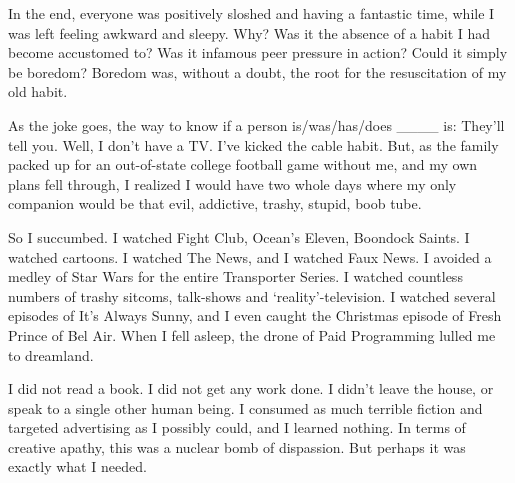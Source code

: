 \documentclass[letterpaper]{article}
\begin{document}
    In the end, everyone was positively sloshed and having a fantastic time, while I was left feeling awkward and sleepy. Why? Was it the absence of a habit I had become accustomed to? Was it infamous peer pressure in action? Could it simply be boredom? Boredom was, without a doubt, the root for the resuscitation of my old habit.

    As the joke goes, the way to know if a person is/was/has/does \_\_\_\_ is: They'll tell you. Well, I don't have a TV. I've kicked the cable habit. But, as the family packed up for an out-of-state college football game without me, and my own plans fell through, I realized I would have two whole days where my only companion would be that evil, addictive, trashy, stupid, boob tube.

    So I succumbed.  I watched Fight Club, Ocean's Eleven, Boondock Saints. I watched cartoons. I watched The News, and I watched Faux News. I avoided a medley of Star Wars for the entire Transporter Series. I watched countless numbers of trashy sitcoms, talk-shows and `reality'-television. I watched several episodes of It's Always Sunny, and I even caught the Christmas episode of Fresh Prince of Bel Air. When I fell asleep, the drone of Paid Programming lulled me to dreamland.

    I did not read a book. I did not get any work done. I didn't leave the house, or speak to a single other human being. I consumed as much terrible fiction and targeted advertising as I possibly could, and I learned nothing. In terms of creative apathy, this was a nuclear bomb of dispassion. But perhaps it was exactly what I needed.
\end{document}
